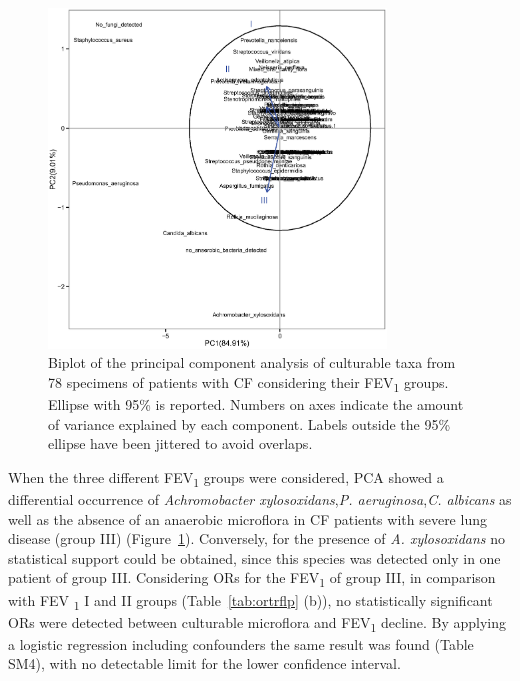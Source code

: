 \begin{figure}[!tb]
	\centering
	\includegraphics[width=0.8\textwidth]{./figures/Chapter_7/Figure_2_fev1_taxa}
  	\caption{\label{fig:fig2fev1taxa}Biplot of the principal component analysis of culturable taxa from 78 specimens of patients with CF considering their FEV\textsubscript{1} groups. Ellipse with 95\% is reported. Numbers on axes indicate the amount of variance explained by each component. Labels outside the 95\% ellipse have been jittered to avoid overlaps.}
\end{figure}
When the three different FEV{\textsubscript{1}} groups were considered, PCA showed a differential occurrence of \textit{Achromobacter xylosoxidans},\textit{P. aeruginosa},\textit{C. albicans} as well as the absence of an anaerobic microflora in CF patients with severe lung disease (group III) (Figure~\ref{fig:fig2fev1taxa}). Conversely, for the presence of \textit{A. xylosoxidans} no statistical support could be obtained, since this species was detected only in one patient of group III. Considering ORs for the FEV\textsubscript{1} of group III, in comparison with FEV \textsubscript{1} I and II groups (Table~\ref{tab:ortrflp} (b)), no statistically significant ORs were detected between culturable microflora and FEV\textsubscript{1} decline. By applying a logistic regression including confounders the same result was found (Table SM4), with no detectable limit for the lower confidence interval.\\

